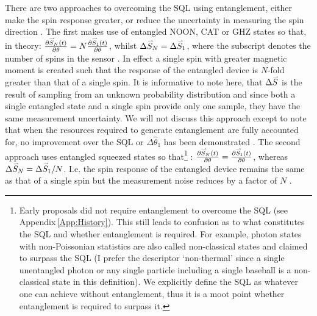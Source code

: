 \documentclass[reqno]{amsart}
\def\est#1{\hat{#1}}
\newcommand{\myvec}[1]{\accentset{\rightharpoonup}{#1}}
\begin{document}
There are two approaches to overcoming the SQL using entanglement, either make the spin response greater, or reduce the uncertainty in measuring the spin direction \cite{Gross2012, Ludlow2015, Pezze2018}. The first makes use of entangled NOON, CAT or GHZ states so that, in theory: $\frac{\partial \myvec{S}_N(t)}{\partial \theta} = N \frac{\partial \myvec{S}_1(t)}{\partial \theta}$, whilst $\Delta \myvec{S}_N = \Delta \myvec{S}_1$, where the subscript denotes the number of spins in the sensor \cite{Pezze2018, Gross2012, Ludlow2015, Bollinger1996, Dowling1998, Childs2000, Campos2003, Kok2004, Leibfried2004, Nagata2007, Resch2007, Berry2009, Dorner2009, Escher2011, Giovannetti2011, Daryanoosh2018, Shaniv2018, Xie2021}. In effect a single spin with greater magnetic moment is created such that the response of the entangled device is $N$-fold greater than that of a single spin. It is informative to note here, that $\Delta \myvec{S}$ is the result of sampling from an unknown probability distribution and since both a single entangled state and a single spin provide only one sample, they have the same measurement uncertainty. We will not discuss this approach except to note that when the resources required to generate entanglement are fully accounted for, no improvement over the SQL or $\Delta \est{\theta}_1$ has been demonstrated \cite{McGuinness2021}. The second approach uses entangled squeezed states so that\footnote{Early proposals did not require entanglement to overcome the SQL (see Appendix\,\ref{App:History}). This still leads to confusion as to what constitutes the SQL and whether entanglement is required. For example, photon states with non-Poissonian statistics are also called non-classical states and claimed to surpass the SQL (I prefer the descriptor `non-thermal' since a single unentangled photon or any single particle including a single baseball is a non-classical state in this definition). We explicitly define the SQL as whatever one can achieve without entanglement, thus it is a moot point whether entanglement is required to surpass it.}%
: $\frac{\partial \myvec{S}_N(t)}{\partial \theta} = \frac{\partial \myvec{S}_1(t)}{\partial \theta}$, whereas $\Delta \myvec{S}_N = \Delta \myvec{S}_1/N$. I.e. the spin response of the entangled device remains the same as that of a single spin but the measurement noise reduces by a factor of $N$ \cite{Caves1981, Pezze2018, Gross2012, Ludlow2015, Walls1983, Wodkiewicz1985, Wu1986, Slusher1987, Xiao1987, Polzik1992, Wineland1992, Kitagawa1993, Wineland1994, Sanders1995, Kuzmich1998, Soerensen1998, Brif1999, Kuzmich2000, Meyer2001, Esteve2008, Appel2009, Eberle2010, Gross2010, Koschorreck2010, Koschorreck2010a, Leroux2010, Leroux2010a, LouchetChauvet2010, SchleierSmith2010, Wasilewski2010, Luecke2011, Sewell2012, Aasi2013, Taylor2013, Bohnet2014, Muessel2014, Strobel2014, Kruse2016, Polzik2016, Cox2016, Davis2016, Bohnet2016, Hosten2016, Macri2016, Linnemann2016, Tse2019, Braverman2019, Schulte2020, Malia2020, Bao2020, PedrozoPenafiel2020, Casacio2021, Gilmore2021, Greve2022, Malia2022}.
\end{document}
